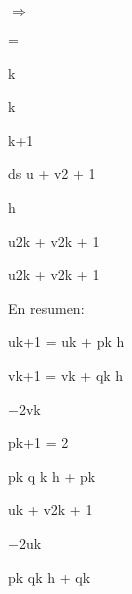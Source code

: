 \documentclass[a4paper,portrait,12pt]{article}
\begin{document}
$\Rightarrow$


=


\begin{flushleft}
k
\end{flushleft}


\begin{flushleft}
k
\end{flushleft}


\begin{flushleft}
k+1
\end{flushleft}


\begin{flushleft}
ds u + v2 + 1
\end{flushleft}


\begin{flushleft}
h
\end{flushleft}


\begin{flushleft}
u2k + v2k + 1
\end{flushleft}


\begin{flushleft}
u2k + v2k + 1
\end{flushleft}


\begin{flushleft}
En resumen:
\end{flushleft}


\begin{flushleft}
uk+1 = uk + pk h
\end{flushleft}


\begin{flushleft}
vk+1 = vk + qk h
\end{flushleft}


\begin{flushleft}
$-$2vk
\end{flushleft}


\begin{flushleft}
pk+1 = 2
\end{flushleft}


\begin{flushleft}
pk q k h + pk
\end{flushleft}


\begin{flushleft}
uk + v2k + 1
\end{flushleft}


\begin{flushleft}
$-$2uk
\end{flushleft}


\begin{flushleft}
pk qk h + qk
\end{flushleft}
\end{document}
